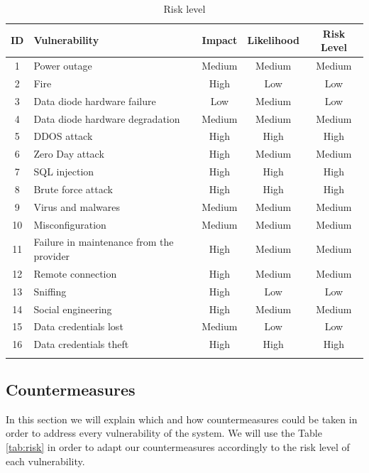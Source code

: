 \documentclass[a4paper,10pt]{article}
\begin{document}
\begin{longtable}{|c|p{4cm}|c|c|c|}
	\hline
	\textbf{ID}& \textbf{Vulnerability}  & \textbf{Impact} & \textbf{Likelihood} & \textbf{Risk Level}          \\
	\hline
	1 & Power outage & Medium & Medium & Medium \\
	\hline
	2 & Fire  & High & Low & Low \\
	\hline
	3 & Data diode hardware failure & Low & Medium & Low \\
	\hline
	4 & Data diode hardware degradation & Medium & Medium & Medium  \\
	\hline
	5 & DDOS attack & High & High & High \\
	\hline
	6 & Zero Day attack & High & Medium & Medium \\
	\hline
	7 &  SQL injection & High & High & High \\
	\hline
	8 & Brute force attack & High & High & High\\
	\hline
	9 & Virus and malwares & Medium & Medium & Medium \\
	\hline
	10 & Misconfiguration & Medium & Medium & Medium \\
	\hline
	11 & Failure in maintenance from the provider & High & Medium & Medium\\
	\hline
	12 & Remote connection & High & Medium & Medium\\
	\hline
	13 & Sniffing & High & Low & Low \\
	\hline
	14 & Social engineering & High & Medium & Medium \\
	\hline
	15 & Data credentials lost & Medium & Low & Low \\
	\hline
	16 & Data credentials theft & High & High & High \\
	\hline
	\caption{Risk level}
	\label{tab:risklvl}
\end{longtable}

\subsection{Countermeasures}
In this section we will explain which and how countermeasures could be taken in order to address every vulnerability of the system. We will use the Table \ref{tab:risk} in order to adapt our countermeasures accordingly to the risk level of each vulnerability.
\end{document}
